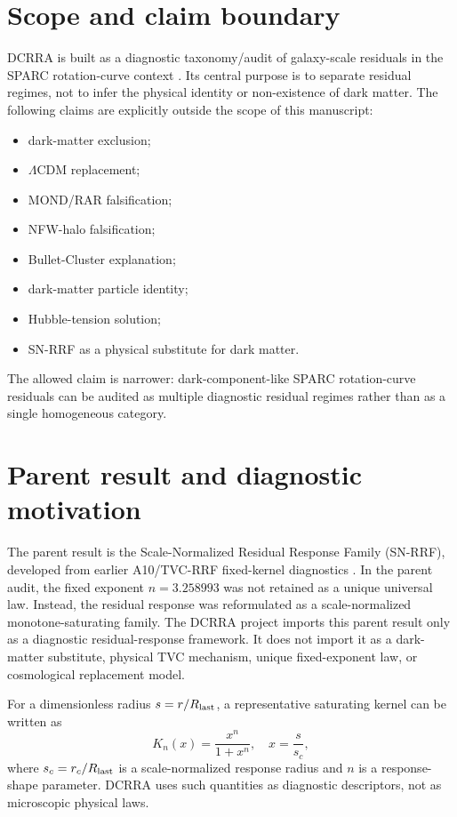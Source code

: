 \documentclass[11pt,a4paper]{article}
\begin{document}
\section{Scope and claim boundary}
DCRRA is built as a diagnostic taxonomy/audit of galaxy-scale residuals in the SPARC rotation-curve context \cite{lelli2016}. Its central purpose is to separate residual regimes, not to infer the physical identity or non-existence of dark matter. The following claims are explicitly outside the scope of this manuscript:
\begin{itemize}
\item dark-matter exclusion;
\item $\Lambda$CDM replacement;
\item MOND/RAR falsification;
\item NFW-halo falsification;
\item Bullet-Cluster explanation;
\item dark-matter particle identity;
\item Hubble-tension solution;
\item SN-RRF as a physical substitute for dark matter.
\end{itemize}
The allowed claim is narrower: dark-component-like SPARC rotation-curve residuals can be audited as multiple diagnostic residual regimes rather than as a single homogeneous category.

\section{Parent result and diagnostic motivation}
The parent result is the Scale-Normalized Residual Response Family (SN-RRF), developed from earlier A10/TVC-RRF fixed-kernel diagnostics \cite{yoshimura2026snrrf}. In the parent audit, the fixed exponent $n=3.258993$ was not retained as a unique universal law. Instead, the residual response was reformulated as a scale-normalized monotone-saturating family. The DCRRA project imports this parent result only as a diagnostic residual-response framework. It does not import it as a dark-matter substitute, physical TVC mechanism, unique fixed-exponent law, or cosmological replacement model.

For a dimensionless radius $s = r/R_{\rm last}$, a representative saturating kernel can be written as
\begin{equation}
K_n(x) = \frac{x^n}{1+x^n},\quad x = \frac{s}{s_c},
\end{equation}
where $s_c=r_c/R_{\rm last}$ is a scale-normalized response radius and $n$ is a response-shape parameter. DCRRA uses such quantities as diagnostic descriptors, not as microscopic physical laws.
\end{document}
